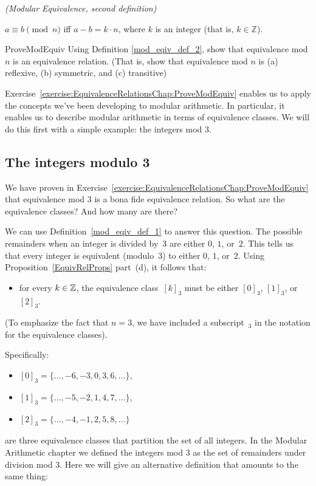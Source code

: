 \begin{defn}\label{mod_eqiv_def_2} \emph{(Modular Equivalence, second definition)}

\medskip
$a \equiv b \pmod{n}$ iff $a - b = k \cdot n$, where $k$ is an integer (that is, $k \in  {\mathbb Z}$). 
\end{defn}

\begin{exercise}{ProveModEquiv}
Using  Definition  \ref{mod_eqiv_def_2}, show that equivalence mod $n$ is an equivalence relation. (That is, show that equivalence mod $n$ is (a) reflexive, (b) symmetric, and (c) transitive)
\end{exercise}

Exercise~\ref{exercise:EquivalenceRelationsChap:ProveModEquiv} enables us to apply the concepts we've been developing to modular arithmetic. In particular, it enables us to describe modular arithmetic in terms of equivalence classes. We will do this first with a simple example: the integers mod 3.

\subsection{The integers modulo 3}

We have proven in Exercise~\ref{exercise:EquivalenceRelationsChap:ProveModEquiv} that equivalence mod 3 is a bona fide equivalence relation. So what are the equivalence classes? And how many are there?
\medskip

We can use Definition~\ref{mod_eqiv_def_1} to answer this question. The possible remainders when an integer is divided by~$3$ are either $0$, $1$, or~$2$. This tells us that  every integer is equivalent (modulo~$3$) to either $0$, $1$, or~$2$. Using Proposition~\ref{EquivRelProps} part~(d), it follows that:
\begin{itemize}
\item[] for every $k \in \mathbb{Z}$, the equivalence class~$[k]_3$ must be either $[0]_3$, $[1]_3$, or~$[2]_3$.
\end{itemize}
(To emphasize the fact that $n = 3$, we have included a subscript~${}_3$ in the notation for the equivalence classes).

\noindent
Specifically:
\begin{itemize}
\item[]
$[0]_3 = \{ \ldots, -6, -3, 0, 3, 6, \ldots \}$,
\item[]
$[1]_3 = \{ \ldots, -5, -2, 1, 4, 7, \ldots \}$,
\item[]
$[2]_3 = \{ \ldots, -4, -1, 2, 5, 8, \ldots \}$
\end{itemize}
are three equivalence classes that partition the set of all  integers.
In the Modular Arithmetic chapter we defined the integers mod 3 as the set of remainders under division mod 3. Here we will give an alternative definition that amounts to the same thing:


